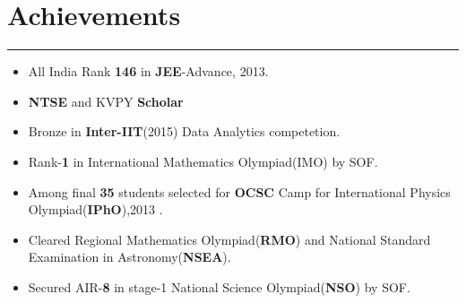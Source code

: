 \documentclass[a4paper]{article}
\begin{document}
 \section*{Achievements}
 \hrule
 \vspace{2mm}
  \begin{itemize}
   \itemsep-0.3em
   \item All India Rank \textbf{146} in \textbf{JEE}-Advance, 2013.	
   \item \textbf{NTSE} and KVPY \textbf{Scholar} 
   \item Bronze in \textbf{Inter-IIT}(2015) Data Analytics competetion.
   \item Rank-\textbf{1} in International Mathematics Olympiad(IMO) by SOF.
   \item Among final \textbf{35} students selected for \textbf{OCSC} Camp for International Physics Olympiad(\textbf{IPhO}),2013 .
   \item Cleared Regional Mathematics Olympiad(\textbf{RMO}) and National Standard Examination in Astronomy(\textbf{NSEA}).
   \item Secured AIR-\textbf{8} in stage-1 National Science Olympiad(\textbf{NSO}) by SOF.
  \end{itemize}
 
 
\end{document}
